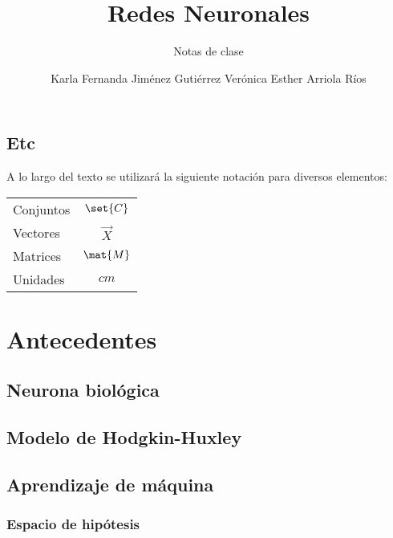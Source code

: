 \documentclass[12pt,openany]{book}
\title{Redes Neuronales}
\subtitle{Notas de clase}
\author{Karla Fernanda Jiménez Gutiérrez\newline
        Verónica Esther Arriola Ríos}
\begin{document}
\maketitle

\frontmatter %
\tableofcontents
\clearemptydoublepage %


\mainmatter  %


\chapter*{Etc}

A lo largo del texto se utilizará la siguiente notación para diversos elementos:
\begin{longtable}{lc}
 Conjuntos   &   $\set{C}$ \\
 Vectores    &   $\vec{X}$ \\
 Matrices    &   $\mat{M}$ \\
 Unidades    &   $\unit{cm}$
\end{longtable}



\part{Antecedentes}
\chapter{Neurona biológica}




\chapter{Modelo de Hodgkin-Huxley}


\chapter{Aprendizaje de máquina}
\section{Espacio de hipótesis}
\end{document}

